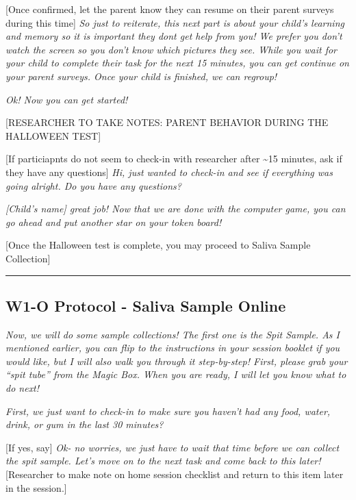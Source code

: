 \documentclass[]{book}
\begin{document}
{[}Once confirmed, let the parent know they can resume on their parent surveys during this time{]} \emph{So just to reiterate, this next part is about your child's learning and memory so it is important they dont get help from you! We prefer you don't watch the screen so you don't know which pictures they see. While you wait for your child to complete their task for the next 15 minutes, you can get continue on your parent surveys. Once your child is finished, we can regroup!}

\emph{Ok! Now you can get started!}

{[}RESEARCHER TO TAKE NOTES: PARENT BEHAVIOR DURING THE HALLOWEEN TEST{]}

{[}If particiapnts do not seem to check-in with researcher after \textasciitilde{}15 minutes, ask if they have any questions{]} \emph{Hi, just wanted to check-in and see if everything was going alright. Do you have any questions?}

\emph{{[}Child's name{]} great job! Now that we are done with the computer game, you can go ahead and put another star on your token board!}

{[}Once the Halloween test is complete, you may proceed to Saliva Sample Collection{]}

\begin{center}\rule{0.5\linewidth}{0.5pt}\end{center}

\hypertarget{w1-o-protocol---saliva-sample-online}{%
\subsection{W1-O Protocol - Saliva Sample Online}\label{w1-o-protocol---saliva-sample-online}}

\emph{Now, we will do some sample collections! The first one is the Spit Sample. As I mentioned earlier, you can flip to the instructions in your session booklet if you would like, but I will also walk you through it step-by-step! First, please grab your ``spit tube'' from the Magic Box. When you are ready, I will let you know what to do next!}

\emph{First, we just want to check-in to make sure you haven't had any food, water, drink, or gum in the last 30 minutes?}

{[}If yes, say{]} \emph{Ok- no worries, we just have to wait that time before we can collect the spit sample. Let's move on to the next task and come back to this later!} {[}Researcher to make note on home session checklist and return to this item later in the session.{]}
\end{document}

